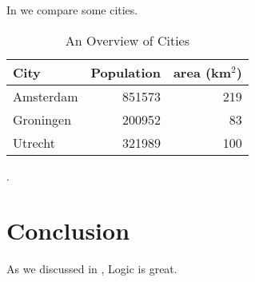 \documentclass[titlepage,a4paper]{report}
\begin{document}
In  we compare some cities.

\begin{table}[H]
  \centering
  \begin{tabular}{l|rr}
    \toprule
    City & Population & area (km$^2$) \\
    \midrule
    Amsterdam & 851573 & 219 \\
    Groningen & 200952 & 83  \\
    Utrecht   & 321989 & 100 \\
    \bottomrule
  \end{tabular}
  \caption{An Overview of Cities}\label{tab:cities}.
\end{table}

\chapter{Conclusion}

As we discussed in , Logic is great.

\lipsum[40-42]

\clearpage
\printbibliography[heading=bibintoc,title=Bibliography]
\end{document}
